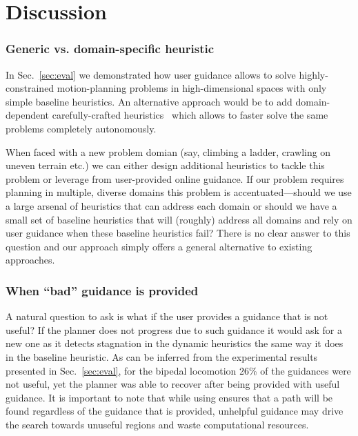 \documentclass{article}
\begin{document}
\section{Discussion}
\label{sec:future}

\subsubsection{Generic vs. domain-specific heuristic}
In Sec.~\ref{sec:eval} we demonstrated how user guidance allows to solve highly-constrained motion-planning problems in high-dimensional spaces with only simple baseline heuristics.
An alternative approach would be to add domain-dependent carefully-crafted heuristics~\cite{DL18,V17} which allows to faster solve the same problems completely autonomously.

When faced with a new problem domian 
(say, climbing a ladder, crawling on uneven terrain etc.)
we can either design additional heuristics to tackle this problem or leverage from user-provided online guidance.
If our problem requires planning in multiple, diverse domains this problem is accentuated---should we  use a large arsenal of heuristics that can address each domain or should we have a small set of baseline heuristics that will (roughly) address all domains and rely on user guidance when these baseline heuristics fail?
There is no clear answer to this question and our approach simply offers a general alternative to existing approaches.

\subsubsection{When ``bad'' guidance is provided}
A natural question to ask is what if the user provides a guidance that is not useful?
If the planner does not progress due to such guidance it would ask for a new one as it detects stagnation in the dynamic heuristics the same way it does in the baseline heuristic. 
As can be inferred from the experimental results presented in Sec.~\ref{sec:eval}, for the bipedal locomotion 26\% of the guidances were not useful, yet the planner was able to recover after being provided with useful guidance. 
It is important to note that while using \mhastar ensures that a path will be found regardless of the  guidance that is provided, unhelpful guidance may drive the search towards unuseful regions and waste computational resources.
\end{document}
